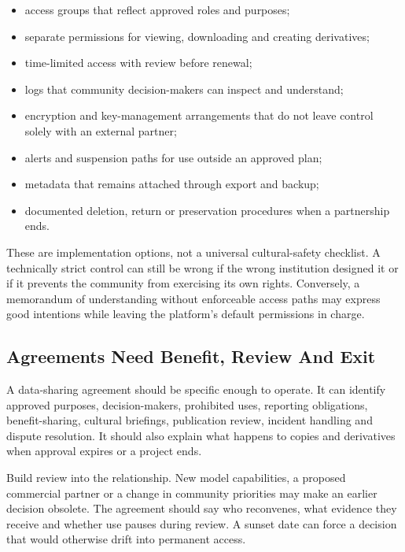 \begin{itemize}[leftmargin=*]
\item access groups that reflect approved roles and purposes;
\item separate permissions for viewing, downloading and creating derivatives;
\item time-limited access with review before renewal;
\item logs that community decision-makers can inspect and understand;
\item encryption and key-management arrangements that do not leave control solely with an external partner;
\item alerts and suspension paths for use outside an approved plan;
\item metadata that remains attached through export and backup;
\item documented deletion, return or preservation procedures when a partnership ends.
\end{itemize}

These are implementation options, not a universal cultural-safety checklist. A technically strict control can still be wrong if the wrong institution designed it or if it prevents the community from exercising its own rights. Conversely, a memorandum of understanding without enforceable access paths may express good intentions while leaving the platform's default permissions in charge.



\subsection{Agreements Need Benefit, Review And Exit}


A data-sharing agreement should be specific enough to operate. It can identify approved purposes, decision-makers, prohibited uses, reporting obligations, benefit-sharing, cultural briefings, publication review, incident handling and dispute resolution. It should also explain what happens to copies and derivatives when approval expires or a project ends.


Build review into the relationship. New model capabilities, a proposed commercial partner or a change in community priorities may make an earlier decision obsolete. The agreement should say who reconvenes, what evidence they receive and whether use pauses during review. A sunset date can force a decision that would otherwise drift into permanent access.


